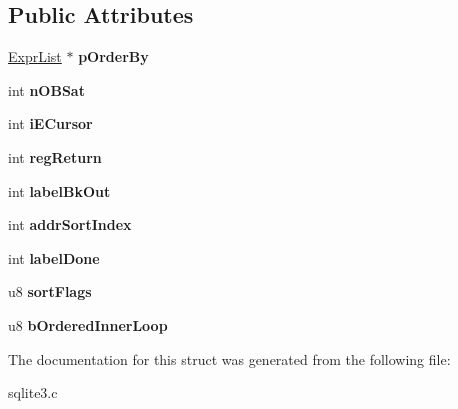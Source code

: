 \subsection*{Public Attributes}
\begin{DoxyCompactItemize}
\item 
\hyperlink{structExprList}{Expr\+List} $\ast$ {\bfseries p\+Order\+By}\hypertarget{structSortCtx_a4c1f59510d6e08b38c958c358d31ba07}{}\label{structSortCtx_a4c1f59510d6e08b38c958c358d31ba07}

\item 
int {\bfseries n\+O\+B\+Sat}\hypertarget{structSortCtx_a32e424bbae6b3e56a0959738eaaaf1d2}{}\label{structSortCtx_a32e424bbae6b3e56a0959738eaaaf1d2}

\item 
int {\bfseries i\+E\+Cursor}\hypertarget{structSortCtx_acaf1633a51ccc836edd0594f90ed501b}{}\label{structSortCtx_acaf1633a51ccc836edd0594f90ed501b}

\item 
int {\bfseries reg\+Return}\hypertarget{structSortCtx_a78017ace0acd29ba15652e389d9f90f6}{}\label{structSortCtx_a78017ace0acd29ba15652e389d9f90f6}

\item 
int {\bfseries label\+Bk\+Out}\hypertarget{structSortCtx_abc19dcb503656023d5596aa31378e973}{}\label{structSortCtx_abc19dcb503656023d5596aa31378e973}

\item 
int {\bfseries addr\+Sort\+Index}\hypertarget{structSortCtx_ad4c264de37b3f3b9bbff55e34659ef11}{}\label{structSortCtx_ad4c264de37b3f3b9bbff55e34659ef11}

\item 
int {\bfseries label\+Done}\hypertarget{structSortCtx_a0f08fc3dd9df4320b3bb74461ca46759}{}\label{structSortCtx_a0f08fc3dd9df4320b3bb74461ca46759}

\item 
u8 {\bfseries sort\+Flags}\hypertarget{structSortCtx_aca4654bd8cf3789c3a1b05d144e3ce2c}{}\label{structSortCtx_aca4654bd8cf3789c3a1b05d144e3ce2c}

\item 
u8 {\bfseries b\+Ordered\+Inner\+Loop}\hypertarget{structSortCtx_a193c1104dbc3f5bfef3bd1f5ae1ada03}{}\label{structSortCtx_a193c1104dbc3f5bfef3bd1f5ae1ada03}

\end{DoxyCompactItemize}


The documentation for this struct was generated from the following file\+:\begin{DoxyCompactItemize}
\item 
sqlite3.\+c\end{DoxyCompactItemize}
